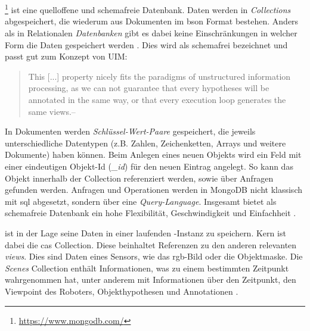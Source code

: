 \section{\mongodb}
\label{sec:mongodb}
\mongodb\footnote{\url{https://www.mongodb.com/}} ist eine quelloffene und schemafreie Datenbank. Daten werden in \textit{Collections} abgespeichert, die wiederum aus Dokumenten im \gls{bson} Format bestehen. Anders als in Relationalen \textit{Datenbanken} gibt es dabei keine Einschränkungen in welcher Form die Daten gespeichert werden \cite{mongoVsOracle}. Dies wird als schemafrei bezeichnet und passt gut zum Konzept von UIM:
\begin{quote}
\glqq This [...] property nicely fits the paradigms of unstructured information processing, as we can not guarantee that every hypotheses will be annotated in the same way, or that every execution loop generates the same views.\grqq \hfill -- \cite{episodicMemory}
\end{quote}
In Dokumenten werden \textit{Schlüssel-Wert-Paare} gespeichert, die jeweils unterschiedliche Datentypen (z.B. Zahlen, Zeichenketten, Arrays und weitere Dokumente) haben können. Beim Anlegen eines neuen Objekts wird ein Feld mit einer eindeutigen Objekt-Id (\textit{\_id}) für den neuen Eintrag angelegt. So kann das Objekt innerhalb der Collection referenziert werden, sowie über Anfragen gefunden werden. Anfragen und Operationen werden in MongoDB nicht klassisch mit \gls{sql} abgesetzt, sondern über eine \textit{Query-Language}. Insgesamt bietet \mongodb als schemafreie Datenbank ein hohe Flexibilität, Geschwindigkeit und Einfachheit \cite{mongoVsOracle}.  \par 
\robosherlock ist in der Lage seine Daten in einer laufenden \mongodb-Instanz zu speichern. Kern ist dabei die \gls{cas} Collection. Diese beinhaltet Referenzen zu den anderen relevanten \textit{views}. Dies sind Daten eines Sensors, wie das \gls{rgb}-Bild oder die Objektmaske. Die \textit{Scenes} Collection enthält Informationen, was \robosherlock zu einem bestimmten Zeitpunkt wahrgenommen hat, unter anderem mit Informationen über den Zeitpunkt, den Viewpoint des Roboters, Objekthypothesen und Annotationen \cite{episodicMemory}.  



